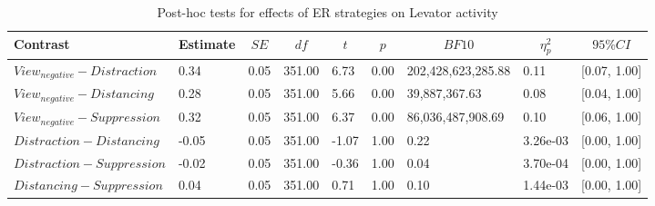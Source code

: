 \documentclass[
  man,floatsintext]{apa6}
\begin{document}
\begin{table}[H]

\begin{center}
\begin{threeparttable}

\caption{\label{tab:SupplEffectER}Post-hoc tests for effects of ER strategies on Levator activity}

\begin{tabular}{lllllllll}
\toprule
Contrast & \multicolumn{1}{c}{Estimate} & \multicolumn{1}{c}{$SE$} & \multicolumn{1}{c}{$df$} & \multicolumn{1}{c}{$t$} & \multicolumn{1}{c}{$p$} & \multicolumn{1}{c}{$BF10$} & \multicolumn{1}{c}{$\eta_{p}^{2}$} & \multicolumn{1}{c}{$95\% CI$}\\
\midrule
$View_{negative} - Distraction$ & 0.34 & 0.05 & 351.00 & 6.73 & 0.00 & 202,428,623,285.88 & 0.11 & {}[0.07, 1.00]\\
$View_{negative} - Distancing$ & 0.28 & 0.05 & 351.00 & 5.66 & 0.00 & 39,887,367.63 & 0.08 & {}[0.04, 1.00]\\
$View_{negative} - Suppression$ & 0.32 & 0.05 & 351.00 & 6.37 & 0.00 & 86,036,487,908.69 & 0.10 & {}[0.06, 1.00]\\
$Distraction - Distancing$ & -0.05 & 0.05 & 351.00 & -1.07 & 1.00 & 0.22 & 3.26e-03 & {}[0.00, 1.00]\\
$Distraction - Suppression$ & -0.02 & 0.05 & 351.00 & -0.36 & 1.00 & 0.04 & 3.70e-04 & {}[0.00, 1.00]\\
$Distancing - Suppression$ & 0.04 & 0.05 & 351.00 & 0.71 & 1.00 & 0.10 & 1.44e-03 & {}[0.00, 1.00]\\
\bottomrule
\end{tabular}

\end{threeparttable}
\end{center}

\end{table}
\end{document}
